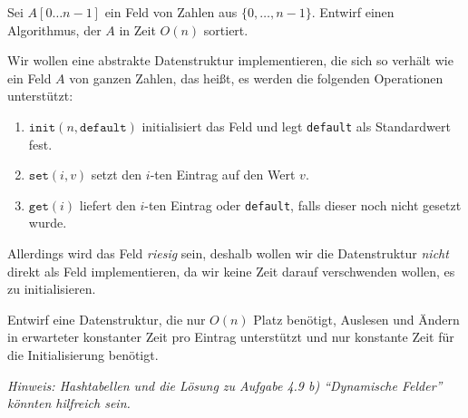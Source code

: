 \documentclass{uebung_cs}
\begin{document}
\begin{aufgabe}%
	Sei $A[0\hdots n-1]$ ein Feld von Zahlen aus $\{0, \dots, n-1\}$.
	Entwirf einen Algorithmus, der $A$ in Zeit $O(n)$ sortiert.
\end{aufgabe}

\begin{aufgabe}
	Wir wollen eine abstrakte Datenstruktur implementieren, die sich so verhält wie ein Feld $A$ von ganzen Zahlen, das heißt, es werden die folgenden Operationen unterstützt:
	\begin{enumerate}
		\item $\texttt{init}(n,\texttt{default})$ initialisiert das Feld und legt \texttt{default} als Standardwert fest.
		\item $\texttt{set}(i,v)$ setzt den $i$-ten Eintrag auf den Wert $v$.
		\item $\texttt{get}(i)$ liefert den $i$-ten Eintrag oder \texttt{default}, falls dieser noch nicht gesetzt wurde.
	\end{enumerate}
	Allerdings wird das Feld \emph{riesig} sein, deshalb wollen wir die Datenstruktur \emph{nicht} direkt als Feld implementieren, da wir keine Zeit darauf verschwenden wollen, es zu initialisieren.

	Entwirf eine Datenstruktur, die nur $O(n)$ Platz benötigt, Auslesen und Ändern in erwarteter konstanter Zeit pro Eintrag unterstützt und nur konstante Zeit für die Initialisierung benötigt.

	\emph{Hinweis: Hashtabellen und die Lösung zu Aufgabe 4.9 b) \enquote{Dynamische Felder} könnten hilfreich sein.}
\end{aufgabe}


\end{document}
